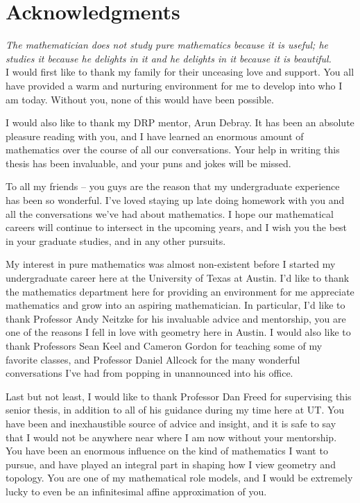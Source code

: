 %
\chapter*{Acknowledgments}
%

%
\subsectionend $ $\\
%
\emph{The mathematician does not study pure mathematics because it is useful;
he studies it because he delights in it and he delights in it because it
is beautiful.} \\
%
%
\subsectionend $ $\\
%

I would first like to thank my family for their unceasing love and support.
You all have provided a warm and nurturing environment for me to develop into
who I am today. Without you, none of this would have been possible.

I would also like to thank my DRP mentor, Arun Debray. It has been an absolute
pleasure reading with you, and I have learned an enormous amount of mathematics
over the course of all our conversations. Your help in writing this thesis
has been invaluable, and your puns and jokes will be missed.

To all my friends -- you guys are the reason that my undergraduate experience
has been so wonderful. I've loved staying up late doing homework with you and
all the conversations we've had about mathematics. I hope our mathematical
careers will continue to intersect in the upcoming years, and I wish you
the best in your graduate studies, and in any other pursuits.

My interest in pure mathematics was almost non-existent before I started my
undergraduate career here at the University of Texas at Austin. I'd like to
thank the mathematics department here for providing an environment for me
appreciate mathematics and grow into an aspiring mathematician. In particular,
I'd like to thank Professor Andy Neitzke for his invaluable advice and mentorship,
you are one of the reasons I fell in love with geometry here in Austin.
I would also like to thank Professors Sean Keel and Cameron Gordon for teaching some
of my favorite classes, and Professor Daniel Allcock for the many wonderful conversations
I've had from popping in unannounced into his office.

Last but not least, I would like to thank Professor Dan Freed for supervising
this senior thesis, in addition to all of his guidance during my time here at UT.
You have been and inexhaustible source of advice and insight, and it is safe to
say that I would not be anywhere near where I am now without your mentorship.
You have been an enormous influence on the kind of mathematics I want to
pursue, and have played an integral part in shaping how I view geometry
and topology. You are one of my mathematical role models, and I would be extremely
lucky to even be an infinitesimal affine approximation of you.
%